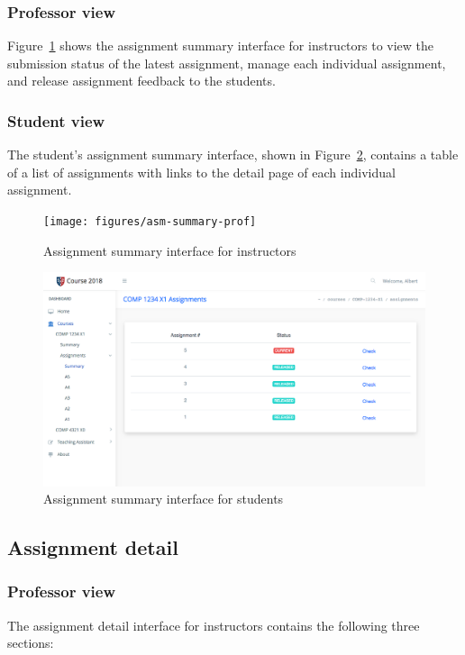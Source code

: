 \subsubsection{Professor view}
Figure~\ref{fig:ASM_SUMMARY_PROF} shows the assignment summary interface for
instructors to view the submission status of the latest assignment, manage
each individual assignment, and release assignment feedback to the students.

\subsubsection{Student view}
The student's assignment summary interface, shown in
Figure~\ref{fig:ASM_SUMMARY_STUDENT}, contains a table of a list
of assignments with links to the detail page of each individual assignment.

\pagebreak

\begin{figure}[H]
    \centering
        \texttt{[image: figures/asm-summary-prof]}
    \caption{Assignment summary interface for instructors}
    \label{fig:ASM_SUMMARY_PROF}
\end{figure}

\begin{figure}[H]
    \centering
        \includegraphics[width=1.0\textwidth]{figures/asm-summary-student}
    \caption{Assignment summary interface for students}
    \label{fig:ASM_SUMMARY_STUDENT}
\end{figure}

\pagebreak

\subsection{Assignment detail}

\subsubsection{Professor view}
The assignment detail interface for instructors contains the following three
sections:

